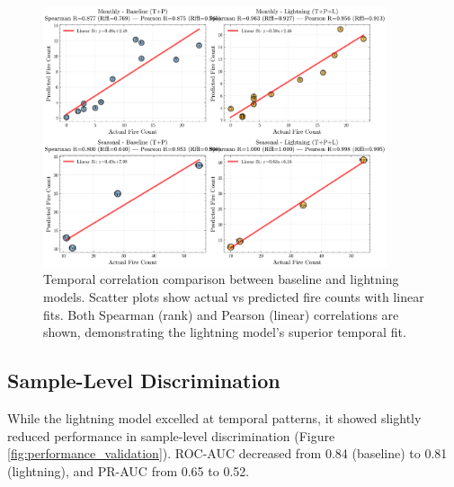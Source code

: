 \documentclass[11pt,a4paper]{article}
\begin{document}
\begin{figure}[H]
\centering
\includegraphics[width=0.9\textwidth]{../output/figures/temporal_correlations_comparison.png}
\caption{Temporal correlation comparison between baseline and lightning models. Scatter plots show actual vs predicted fire counts with linear fits. Both Spearman (rank) and Pearson (linear) correlations are shown, demonstrating the lightning model's superior temporal fit.}
\label{fig:temporal_correlations}
\end{figure}

\subsection{Sample-Level Discrimination}

While the lightning model excelled at temporal patterns, it showed slightly reduced performance in sample-level discrimination (Figure \ref{fig:performance_validation}). ROC-AUC decreased from 0.84 (baseline) to 0.81 (lightning), and PR-AUC from 0.65 to 0.52.
\end{document}

